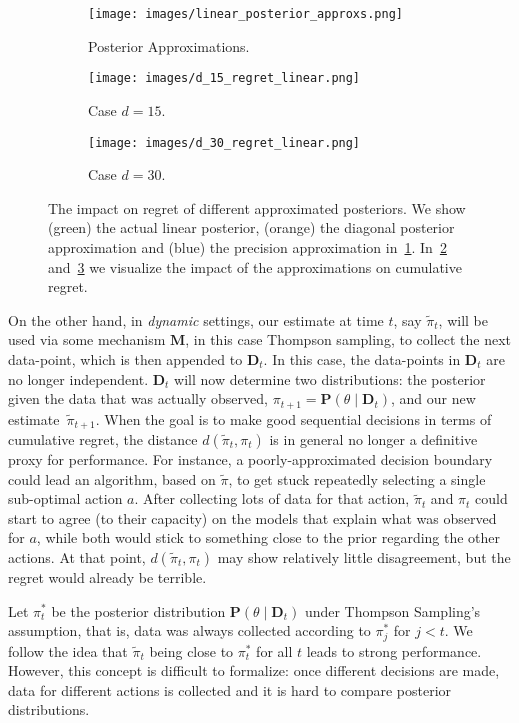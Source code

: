 \documentclass{article} \usepackage{iclr2018_conference,times}
\begin{document}
\begin{figure}[t]
\begin{subfigure}[c]{0.31\textwidth}\texttt{[image: images/linear\_posterior\_approxs.png]}
  \caption{Posterior Approximations.}
  \label{fig:figure4}
\end{subfigure}
\begin{subfigure}[c]{0.31\textwidth}\texttt{[image: images/d\_15\_regret\_linear.png]}
  \caption{Case $d = 15$.}
  \label{fig:figure5}
\end{subfigure}
\begin{subfigure}[c]{0.31\textwidth}\texttt{[image: images/d\_30\_regret\_linear.png]}
  \caption{Case $d = 30$.}
  \label{fig:figure6}
\end{subfigure}
\caption{The impact on regret of different approximated posteriors. We show (green) the actual linear posterior, (orange) the diagonal posterior approximation and (blue) the precision approximation in~\ref{fig:figure4}.  In~\ref{fig:figure5} and~\ref{fig:figure6} we visualize the impact of the approximations on cumulative regret.}
\label{fig:lin2}
\end{figure}

On the other hand, in \emph{dynamic} settings, our estimate at time $t$, say $\tilde{\pi}_t$, will be used via some mechanism $\mathbf{M}$, in this case Thompson sampling, to collect the next data-point, which is then appended to $\mathbf{D}_t$. In this case, the data-points in $\mathbf{D}_t$ are no longer independent.
$\mathbf{D}_t$ will now determine two distributions: the posterior given the data that was actually observed, $\pi_{t+1} = \mathbf{P}(\theta \mid \mathbf{D}_t)$, and our new estimate~$\tilde{\pi}_{t+1}$.
When the goal is to make good sequential decisions in terms of cumulative regret, the distance $d(\tilde{\pi}_t, \pi_{t})$ is in general no longer a definitive proxy for performance.
For instance, a poorly-approximated decision boundary could lead an algorithm, based on $\tilde{\pi}$, to get stuck repeatedly selecting a single sub-optimal action $a$.
After collecting lots of data for that action, $\tilde{\pi}_t$ and $\pi_{t}$ could start to agree (to their capacity) on the models that explain what was observed for $a$, while both would stick to something close to the prior regarding the other actions.
At that point, $d(\tilde{\pi}_t, \pi_{t})$ may show relatively little disagreement, but the regret would already be terrible.

Let $\pi_{t}^*$ be the posterior distribution $\mathbf{P}(\theta \mid \mathbf{D}_t)$ under Thompson Sampling's assumption, that is, data was always collected according to $\pi_{j}^*$ for $j < t$.
We follow the idea that $\tilde{\pi}_t$ being close to $\pi_{t}^*$ for all $t$ leads to strong performance.
However, this concept is difficult to formalize: once different decisions are made, data for different actions is collected and it is hard to compare posterior distributions.
\end{document}

